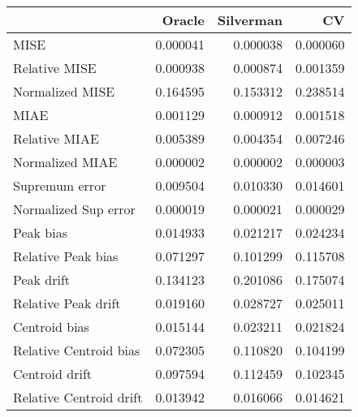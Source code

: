 \begin{tabular}{lrrr}
  \toprule
 & Oracle & Silverman & CV \\ 
  \midrule
MISE & 0.000041 & 0.000038 & 0.000060 \\ 
  Relative MISE & 0.000938 & 0.000874 & 0.001359 \\ 
  Normalized MISE & 0.164595 & 0.153312 & 0.238514 \\ 
  MIAE & 0.001129 & 0.000912 & 0.001518 \\ 
  Relative MIAE & 0.005389 & 0.004354 & 0.007246 \\ 
  Normalized MIAE & 0.000002 & 0.000002 & 0.000003 \\ 
  Supremum error & 0.009504 & 0.010330 & 0.014601 \\ 
  Normalized Sup error & 0.000019 & 0.000021 & 0.000029 \\ 
  Peak bias & 0.014933 & 0.021217 & 0.024234 \\ 
  Relative Peak bias & 0.071297 & 0.101299 & 0.115708 \\ 
  Peak drift & 0.134123 & 0.201086 & 0.175074 \\ 
  Relative Peak drift & 0.019160 & 0.028727 & 0.025011 \\ 
  Centroid bias & 0.015144 & 0.023211 & 0.021824 \\ 
  Relative Centroid bias & 0.072305 & 0.110820 & 0.104199 \\ 
  Centroid drift & 0.097594 & 0.112459 & 0.102345 \\ 
  Relative Centroid drift & 0.013942 & 0.016066 & 0.014621 \\ 
   \bottomrule
\end{tabular}
